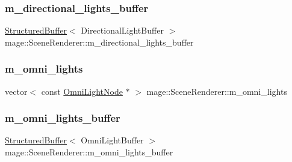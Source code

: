 \hypertarget{classmage_1_1_scene_renderer_a50adb8fd1b962bd5b9268b1a02387ac8}{}\label{classmage_1_1_scene_renderer_a50adb8fd1b962bd5b9268b1a02387ac8} 
\subsubsection{\texorpdfstring{m\+\_\+directional\+\_\+lights\+\_\+buffer}{m\_directional\_lights\_buffer}}
{\footnotesize\ttfamily \hyperlink{structmage_1_1_structured_buffer}{Structured\+Buffer}$<$ Directional\+Light\+Buffer $>$ mage\+::\+Scene\+Renderer\+::m\+\_\+directional\+\_\+lights\+\_\+buffer\hspace{0.3cm}{\ttfamily [private]}}

\hypertarget{classmage_1_1_scene_renderer_a90d14f98eeeb61eec43ab45c6c69f317}{}\label{classmage_1_1_scene_renderer_a90d14f98eeeb61eec43ab45c6c69f317} 
\subsubsection{\texorpdfstring{m\+\_\+omni\+\_\+lights}{m\_omni\_lights}}
{\footnotesize\ttfamily vector$<$ const \hyperlink{namespacemage_a1724c6e6b6b5ba535cdd967cbbb4a669}{Omni\+Light\+Node} $\ast$ $>$ mage\+::\+Scene\+Renderer\+::m\+\_\+omni\+\_\+lights\hspace{0.3cm}{\ttfamily [private]}}

\hypertarget{classmage_1_1_scene_renderer_a77e6523d04ac9e13ce8d511cc3e7f98f}{}\label{classmage_1_1_scene_renderer_a77e6523d04ac9e13ce8d511cc3e7f98f} 
\subsubsection{\texorpdfstring{m\+\_\+omni\+\_\+lights\+\_\+buffer}{m\_omni\_lights\_buffer}}
{\footnotesize\ttfamily \hyperlink{structmage_1_1_structured_buffer}{Structured\+Buffer}$<$ Omni\+Light\+Buffer $>$ mage\+::\+Scene\+Renderer\+::m\+\_\+omni\+\_\+lights\+\_\+buffer\hspace{0.3cm}{\ttfamily [private]}}

